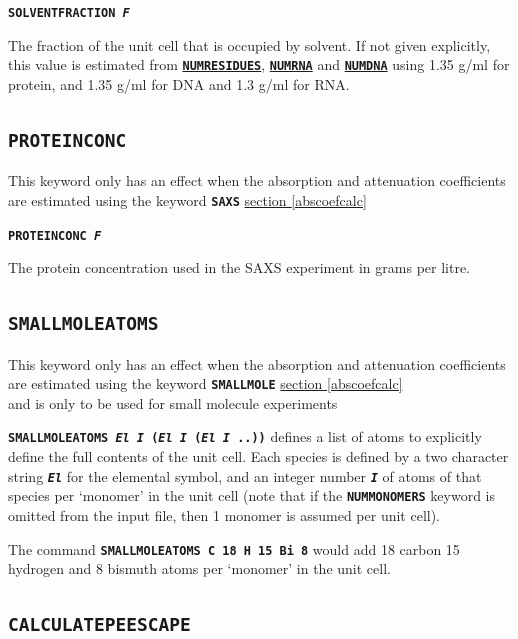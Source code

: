 \documentclass[a4paper]{article}
\newcommand{\Keyword}[1]{\texttt{\textbf{#1}}\xspace}
\newcommand{\SB}{\\[0.2em]}
\begin{document}
\noindent \Keyword{SOLVENTFRACTION \textit{F}}

The fraction of the unit cell that is occupied by solvent. If not given explicitly, this value is estimated from \hyperref[numresidues]{\Keyword{NUMRESIDUES}}, \hyperref[numrna]{\Keyword{NUMRNA}} and \hyperref[numdna]{\Keyword{NUMDNA}} using 1.35 g/ml for protein, and 1.35 g/ml for DNA and 1.3 g/ml for RNA.


\subsection{\Keyword{PROTEINCONC}}
\label{proteinconc}
This keyword only has an effect when the absorption and attenuation coefficients are estimated using the keyword \Keyword{SAXS} \hyperref[abscoefcalc]{section \ref*{abscoefcalc}\SB}

\noindent \Keyword{PROTEINCONC \textit{F}}

The protein concentration used in the SAXS experiment in grams per litre.


\subsection{\Keyword{SMALLMOLEATOMS}}
\label{amallmoleatoms}
This keyword only has an effect when the absorption and attenuation coefficients are estimated using the keyword \Keyword{SMALLMOLE} \hyperref[abscoefcalc]{section \ref*{abscoefcalc}\SB} and is only to be used for small molecule experiments

\noindent \Keyword{SMALLMOLEATOMS \textit{El I} (\textit{El I} (\textit{El I} ..))}
defines a list of atoms to explicitly define the full contents of the unit cell. Each species is defined by a two character string \Keyword{\textit{El}} for the elemental symbol, and an integer number \Keyword{\textit{I}} of atoms of that species per `monomer' in the unit cell (note that if the  \Keyword{NUMMONOMERS} keyword is omitted from the input file, then 1 monomer is assumed per unit cell).

The command \Keyword{SMALLMOLEATOMS C 18 H 15 Bi 8} would add 18 carbon 15 hydrogen and 8 bismuth atoms per `monomer' in the unit cell.

\subsection{\Keyword{CALCULATEPEESCAPE}}
\label{calculatepeescape}
\end{document}
